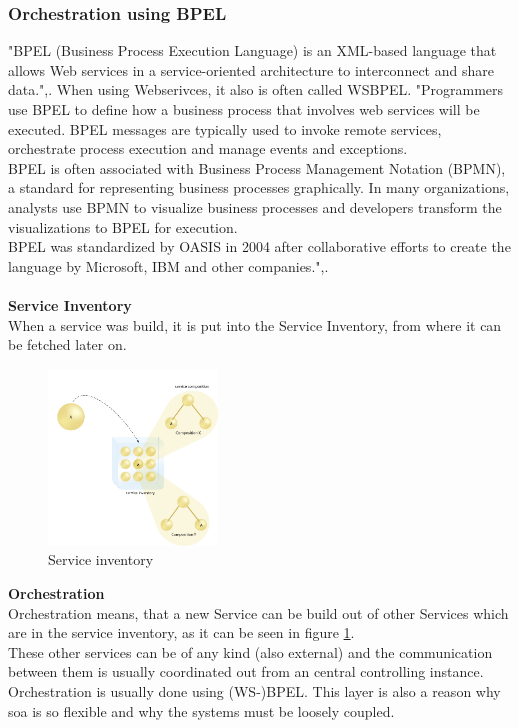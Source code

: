 \documentclass[12pt]{article}
\begin{document}
\subsubsection{Orchestration using BPEL}
\label{sec:bpel}
"BPEL (Business Process Execution Language) is an XML-based language that allows Web services in a service-oriented architecture to interconnect and share data.",\cite{bpelsearchsoa}. When using Webserivces, it also is often called WSBPEL. "Programmers use BPEL to define how a business process that involves web services will be executed. BPEL messages are typically used to invoke remote services, orchestrate process execution and manage events and exceptions.\\
BPEL is often associated with Business Process Management Notation (BPMN), a standard for representing business processes graphically. In many organizations, analysts use BPMN to visualize business processes and developers transform the visualizations to BPEL for execution.\\
BPEL was standardized by OASIS in 2004 after collaborative efforts to create the language by Microsoft, IBM and other companies.",\cite{bpelsearchsoa}.\\
\\
\textbf{Service Inventory}\\
When a service was build, it is put into the Service Inventory, from where it can be fetched later on.
\begin{figure}[here!]
	\centering
	\includegraphics[width=0.4\textwidth]{images/picservi0}
	\caption{Service inventory\cite{picservi}}
	\label{fig:Serviceinventory}
	\end{figure}
	\FloatBarrier \noindent
\textbf{Orchestration}\\
Orchestration means, that a new Service can be build out of other Services which are in the service inventory, as it can be seen in figure \ref{fig:Serviceinventory}. \\
These other services can be of any kind (also external) and the communication between them is usually coordinated out from an central controlling instance. Orchestration is usually done using (WS-)BPEL. This layer is also a reason why \gls{soa} is so flexible and why the systems must be loosely coupled. \cite[page 29]{soagoesreal}\\ \\
\end{document}
